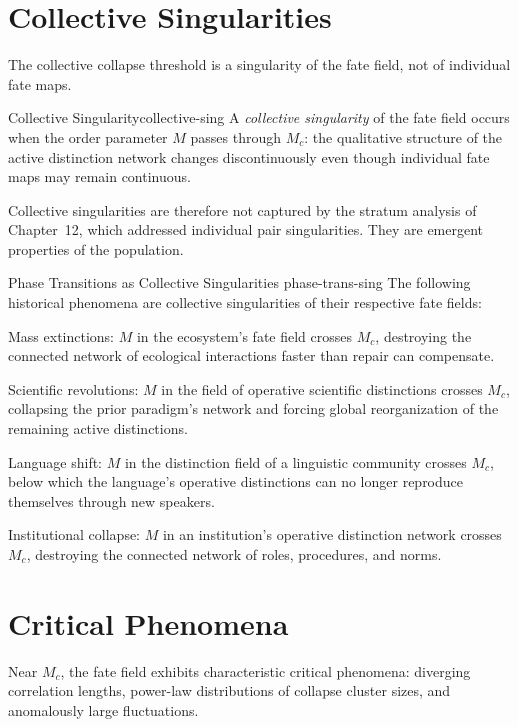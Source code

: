 \documentclass[12pt,twoside,openright]{book}
\providecommand{\orderParam}{M}
\providecommand{\critThresh}{M_{c}}
\begin{document}
\section{Collective Singularities}

The collective collapse threshold is a singularity of the fate
field, not of individual fate maps.

\begin{definition}{Collective Singularity}{collective-sing}
A \emph{collective singularity} of the fate field occurs when
the order parameter $\orderParam$ passes through $\critThresh$:
the qualitative structure of the active distinction network
changes discontinuously even though individual fate maps may
remain continuous.
\end{definition}

Collective singularities are therefore not captured by the
stratum analysis of Chapter~12, which addressed individual pair
singularities. They are emergent properties of the population.

\begin{corollary}{Phase Transitions as Collective Singularities}%
  {phase-trans-sing}
The following historical phenomena are collective singularities
of their respective fate fields:

Mass extinctions: $\orderParam$ in the ecosystem's fate field
crosses $\critThresh$, destroying the connected network of
ecological interactions faster than repair can compensate.

Scientific revolutions: $\orderParam$ in the field of operative
scientific distinctions crosses $\critThresh$, collapsing the
prior paradigm's network and forcing global reorganization of
the remaining active distinctions.

Language shift: $\orderParam$ in the distinction field of a
linguistic community crosses $\critThresh$, below which the
language's operative distinctions can no longer reproduce
themselves through new speakers.

Institutional collapse: $\orderParam$ in an institution's
operative distinction network crosses $\critThresh$, destroying
the connected network of roles, procedures, and norms.
\end{corollary}

\section{Critical Phenomena}

Near $\critThresh$, the fate field exhibits characteristic
critical phenomena: diverging correlation lengths,
power-law distributions of collapse cluster sizes, and
anomalously large fluctuations.
\end{document}
